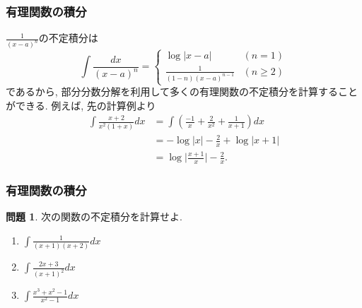 \documentclass[dvipdfmx,cjk,10.2pt]{beamer}
\theoremstyle{definition}
\newtheorem{Prob}[Thm]{問題}
\begin{document}
\begin{frame}
\frametitle{有理関数の積分}

$\frac{1}{(x-a)^n}$の不定積分は
$$
\int \frac{dx}{(x-a)^n}=
\begin{cases}
\log|x-a| & (n=1)\\
\frac{1}{(1-n)(x-a)^{n-1}} & (n \ge 2)
\end{cases}
$$
であるから, 部分分数分解を利用して多くの有理関数の不定積分を計算することができる. 
例えば, 先の計算例より
\begin{align*}
\int \frac{x+2}{x^2(1+x)} dx
& =  \int (\frac{-1}{x}+  \frac{2}{x^2}+ \frac{1}{x+1})dx \\
& =  -\log |x| -\frac{2}{x} + \log |x+1| \\
& = \log \Big| \frac{x+1}{x}\Big| -\frac{2}{x}. 
\end{align*}


\end{frame}





\begin{frame}
\frametitle{有理関数の積分}

\begin{Prob}
次の関数の不定積分を計算せよ. 
\begin{enumerate}
\item $\int \frac{1}{(x+1)(x+2)} dx$
\item $\int \frac{2x+3}{(x+1)^2} dx$
\item $\int \frac{x^3+x^2-1}{x^2-1}dx$
\end{enumerate}
\end{Prob}

\end{frame}

\end{document}
